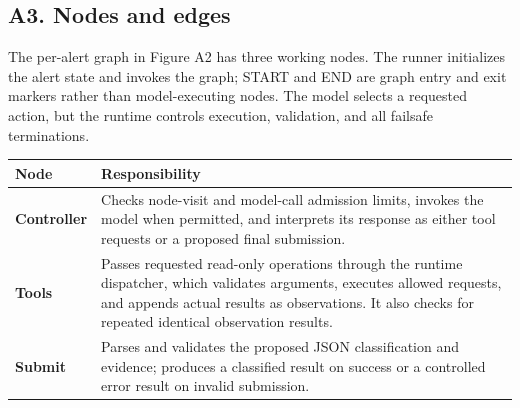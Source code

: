\documentclass[11pt]{article}
\begin{document}
\clearpage
\subsection*{A3. Nodes and edges}
The per-alert graph in Figure A2 has three working nodes. The runner initializes the alert state and invokes the graph; START and END are graph entry and exit markers rather than model-executing nodes. The model selects a requested action, but the runtime controls execution, validation, and all failsafe terminations.

\medskip
\begin{center}
\begin{tabular}{@{}p{}p{}@{}}
\toprule
\textbf{Node} & \textbf{Responsibility} \\
\midrule
\textbf{Controller} & Checks node-visit and model-call admission limits, invokes the model when permitted, and interprets its response as either tool requests or a proposed final submission. \\
\textbf{Tools} & Passes requested read-only operations through the runtime dispatcher, which validates arguments, executes allowed requests, and appends actual results as observations. It also checks for repeated identical observation results. \\
\textbf{Submit} & Parses and validates the proposed JSON classification and evidence; produces a classified result on success or a controlled error result on invalid submission. \\
\bottomrule
\end{tabular}
\end{center}
\end{document}
